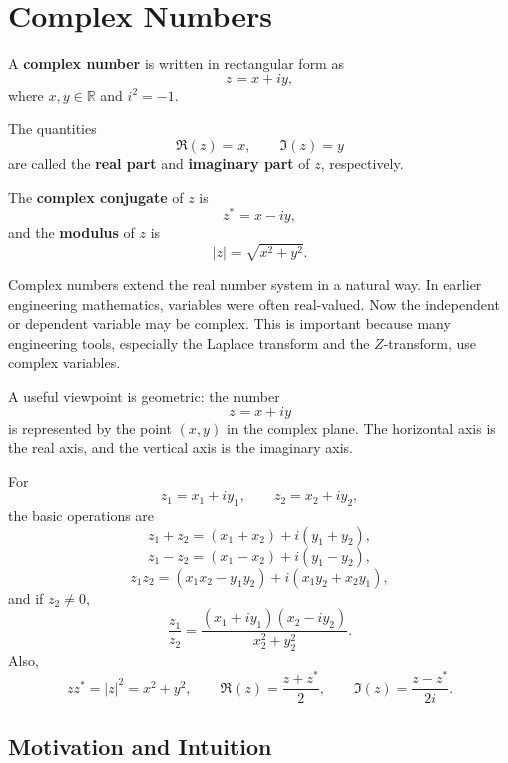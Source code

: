 
\section{Complex Numbers}

\begin{conceptbox}
    A \textbf{complex number} is written in rectangular form as
    \[
        z = x + iy,
    \]
    where $x,y \in \mathbb{R}$ and $i^2 = -1$.

    The quantities
    \[
        \Re(z)=x, \qquad \Im(z)=y
    \]
    are called the \textbf{real part} and \textbf{imaginary part} of $z$, respectively.

    The \textbf{complex conjugate} of $z$ is
    \[
        z^* = x - iy,
    \]
    and the \textbf{modulus} of $z$ is
    \[
        |z| = \sqrt{x^2+y^2}.
    \]
\end{conceptbox}

Complex numbers extend the real number system in a natural way. In earlier engineering mathematics, variables were often real-valued. Now the independent or dependent variable may be complex. This is important because many engineering tools, especially the Laplace transform and the $Z$-transform, use complex variables.

A useful viewpoint is geometric: the number
\[
    z=x+iy
\]
is represented by the point $(x,y)$ in the complex plane. The horizontal axis is the real axis, and the vertical axis is the imaginary axis.

\begin{conceptbox}
    For
    \[
        z_1=x_1+iy_1, \qquad z_2=x_2+iy_2,
    \]
    the basic operations are
    \[
        z_1+z_2=(x_1+x_2)+i(y_1+y_2),
    \]
    \[
        z_1-z_2=(x_1-x_2)+i(y_1-y_2),
    \]
    \[
        z_1z_2=(x_1x_2-y_1y_2)+i(x_1y_2+x_2y_1),
    \]
    and if $z_2\neq 0$,
    \[
        \frac{z_1}{z_2}
        =
        \frac{(x_1+iy_1)(x_2-iy_2)}{x_2^2+y_2^2}.
    \]
    Also,
    \[
        zz^*=|z|^2=x^2+y^2,
        \qquad
        \Re(z)=\frac{z+z^*}{2},
        \qquad
        \Im(z)=\frac{z-z^*}{2i}.
    \]
\end{conceptbox}

\subsection*{Motivation and Intuition}

